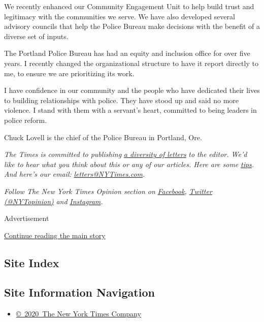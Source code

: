 We recently enhanced our Community Engagement Unit to help build trust
and legitimacy with the communities we serve. We have also developed
several advisory councils that help the Police Bureau make decisions
with the benefit of a diverse set of inputs.

The Portland Police Bureau has had an equity and inclusion office for
over five years. I recently changed the organizational structure to have
it report directly to me, to ensure we are prioritizing its work.

I have confidence in our community and the people who have dedicated
their lives to building relationships with police. They have stood up
and said no more violence. I stand with them with a servant's heart,
committed to being leaders in police reform.

Chuck Lovell is the chief of the Police Bureau in Portland, Ore.

\emph{The Times is committed to publishing}
\href{https://www.nytimes3xbfgragh.onion/2019/01/31/opinion/letters/letters-to-editor-new-york-times-women.html}{\emph{a
diversity of letters}} \emph{to the editor. We'd like to hear what you
think about this or any of our articles. Here are some}
\href{https://help.nytimes3xbfgragh.onion/hc/en-us/articles/115014925288-How-to-submit-a-letter-to-the-editor}{\emph{tips}}\emph{.
And here's our email:}
\href{mailto:letters@NYTimes.com}{\emph{letters@NYTimes.com}}\emph{.}

\emph{Follow The New York Times Opinion section on}
\href{https://www.facebookcorewwwi.onion/nytopinion}{\emph{Facebook}}\emph{,}
\href{http://twitter.com/NYTOpinion}{\emph{Twitter (@NYTopinion)}}
\emph{and}
\href{https://www.instagram.com/nytopinion/}{\emph{Instagram}}\emph{.}

Advertisement

\protect\hyperlink{after-bottom}{Continue reading the main story}

\hypertarget{site-index}{%
\subsection{Site Index}\label{site-index}}

\hypertarget{site-information-navigation}{%
\subsection{Site Information
Navigation}\label{site-information-navigation}}

\begin{itemize}
\tightlist
\item
  \href{https://help.nytimes3xbfgragh.onion/hc/en-us/articles/115014792127-Copyright-notice}{©~2020~The
  New York Times Company}
\end{itemize}

